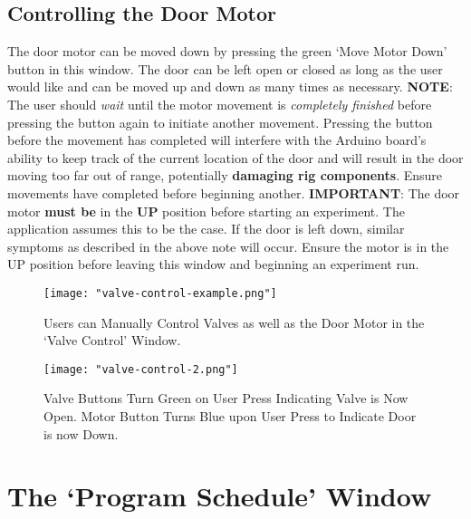 \documentclass{article}
\begin{document}
\subsection{Controlling the Door Motor}
The door motor can be moved down by pressing the green `Move Motor Down' button in this window. The door can be left open or closed as long as the user would like and 
can be moved up and down as many times as necessary. 
\newline
\newline
\textbf{NOTE}: The user should \textit{wait} until the motor movement is \textit{completely finished} before pressing the button again to initiate another movement. 
\newline
\newline
Pressing 
the button before the movement has completed will interfere with the Arduino board's ability to keep track of the current location of the door and will result in the door 
moving too far out of range, potentially \textbf{damaging rig components}. Ensure movements have completed before beginning another.
\newline
\newline
\textbf{IMPORTANT}: The door motor \textbf{must be} in the \textbf{UP} position before starting an experiment. The application assumes this to be the case. If the door is 
left down, similar symptoms as described in the above note will occur. Ensure the motor is in the UP position before leaving this window and beginning an experiment run.

\begin{figure}[h!]
    \centering
    \texttt{[image: "valve-control-example.png"]}
    \caption{Users can Manually Control Valves as well as the Door Motor in the `Valve Control' Window.}
    \label{fig:valve-control-example}
\end{figure}
\FloatBarrier

\begin{figure}[h!]
    \centering
    \texttt{[image: "valve-control-2.png"]}
    \caption{Valve Buttons Turn Green on User Press Indicating Valve is Now Open. Motor Button Turns Blue upon User Press to Indicate Door is now Down.}
    \label{fig:valve-control-2}
\end{figure}
\FloatBarrier

\clearpage
\section{The `Program Schedule' Window}
\label{sec:program-schedule}
\end{document}
